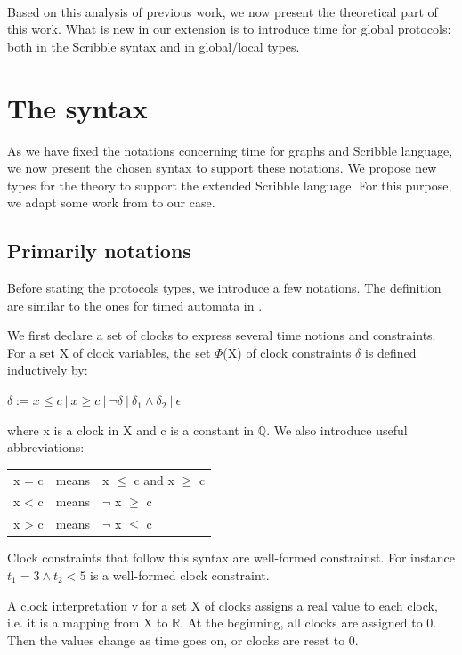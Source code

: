 \documentclass[a4paper,11pt,twoside]{report}
\begin{document}
~~\\

Based on this analysis of previous work, we now present the theoretical part of this work. What is new in our extension is to introduce time for global protocols: both in the Scribble syntax and in global/local types.

\section{The syntax}
As we have fixed the notations concerning time for graphs and Scribble language, we now present the chosen syntax to support these notations. We propose new types for the theory to support the extended Scribble language. For this purpose, we adapt some work from \cite{alur1994theory,saeedloei2008timed} to our case.


\subsection{Primarily notations}
Before stating the protocols types, we introduce a few notations. The definition are similar to the ones for timed automata in \cite{alur1994theory}.

We first declare a set of clocks to express several time notions and constraints. For a set X of clock variables, the set $\Phi$(X) of clock constraints $\delta$ is defined inductively by:
\begin{center}
$\delta := x \le c ~|~ x \ge c ~|~ \neg \delta ~|~ \delta_{1} \wedge \delta_{2} ~|~ \epsilon$ 
\end{center}
where x is a clock in X and c is a constant in $\mathbb{Q}$.
We also introduce useful abbreviations:
\begin{center}
\begin{tabular}{rcl}
x = c& means& x $\le$ c and  x $\ge$ c\\
x < c& means& $\neg$ x $\ge$ c\\
x > c& means& $\neg$ x $\le$ c\\
\end{tabular}
\end{center}
Clock constraints that follow this syntax are well-formed constrainst. For instance $t_1 = 3 \wedge t_2 < 5$ is a well-formed clock constraint.

A clock interpretation v for a set X of clocks assigns a real value to each clock, i.e. it is a mapping from X to $\mathbb{R}$. At the beginning, all clocks are assigned to 0. Then the values change as time goes on, or clocks are reset to 0.
\end{document}
